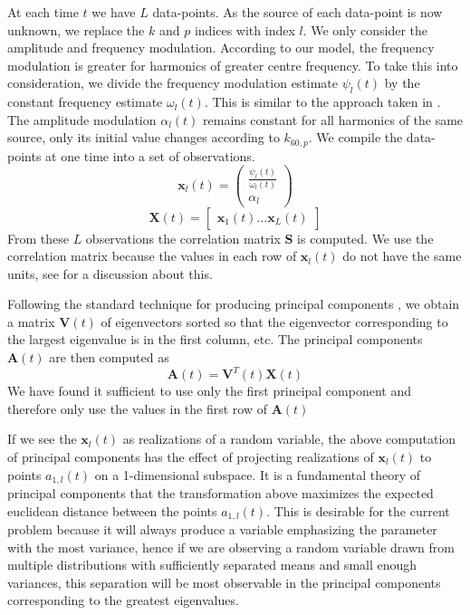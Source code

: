 At each time $t$ we have $L$ data-points. As the source of each data-point is
now unknown, we replace the $k$ and $p$ indices with index $l$. We only consider
the amplitude and frequency modulation. According to our model, the frequency
modulation is greater for harmonics of greater centre frequency. To take this
into consideration, we divide the frequency modulation estimate $\psi_{l}(t)$ by
the constant frequency estimate $\omega_{l}(t)$. This is similar to the approach
taken in \cite{creager2016musicalsource}. The amplitude modulation $\alpha_{l}(t)$
remains constant for all harmonics of the same source, only its initial value
changes according to $k_{60,p}$.  We compile the data-points at one time into a
set of observations.
\begin{equation}
    \mathbf{x}_{l}(t) = \begin{pmatrix}
        \frac{\psi_{l}(t)}{\omega_{l}(t)} \\
        \alpha_{l}
    \end{pmatrix}
\end{equation}
\begin{equation}
    \mathbf{X}(t) = \begin{bmatrix}
        \mathbf{x}_{1}(t) \ldots \mathbf{x}_{L}(t)
    \end{bmatrix}
\end{equation}
From these $L$ observations the correlation matrix $\mathbf{S}$ is computed. We
use the correlation matrix because the values in each row of $\mathbf{x}_{l}(t)$
do not have the same units, see \cite[p.~22]{jolliffe2002principal} for a
discussion about this. 

Following the standard technique for producing principal components
\cite[p.~11]{jolliffe2002principal}, we obtain a matrix $\mathbf{V}(t)$ of
eigenvectors sorted so that the eigenvector corresponding to the largest
eigenvalue is in the first column, etc.  The principal components
$\mathbf{A}(t)$ are then computed as
\begin{equation}
    \mathbf{A}(t) = \mathbf{V}^{T}(t)\mathbf{X}(t)
\end{equation}
We have found it sufficient to use only the first principal component and
therefore only use the values in the first row of $\mathbf{A}(t)$

If we see the $\mathbf{x}_{l}(t)$ as realizations of a random variable, the
above computation of principal components has the effect of projecting
realizations of $\mathbf{x}_{l}(t)$ to points $a_{1,l}(t)$ on a 1-dimensional
subspace. It is a fundamental theory of principal components that the
transformation above maximizes the expected euclidean distance between the
points $a_{1,l}(t)$. This is desirable for the current problem because it will
always produce a variable emphasizing the parameter with the most variance,
hence if we are observing a random variable drawn from multiple distributions
with sufficiently separated means and small enough variances, this separation
will be most observable in the principal components corresponding to the
greatest eigenvalues.

